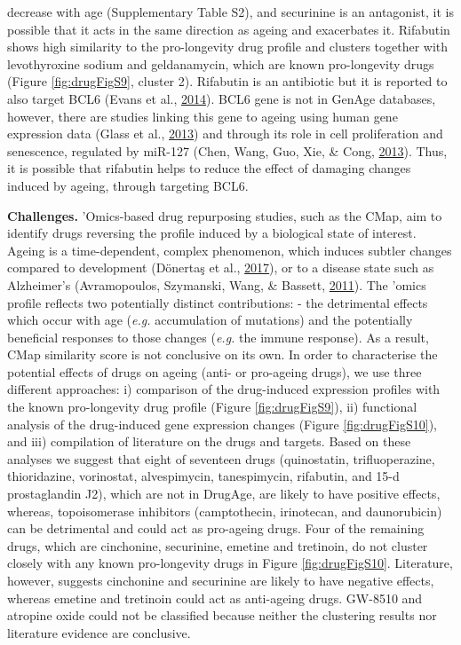 \documentclass[12pt,twoside]{unicam}
\begin{document}
decrease with age (Supplementary Table S2), and securinine is an antagonist, it is possible that it acts in the same direction as ageing and exacerbates it. Rifabutin shows high similarity to the pro-longevity drug profile and clusters together with levothyroxine sodium and geldanamycin, which are known pro-longevity drugs (Figure \ref{fig:drugFigS9}, cluster 2). Rifabutin is an antibiotic but it is reported to also target BCL6 (Evans et al., \protect\hyperlink{ref-Evans2014}{2014}). BCL6 gene is not in GenAge databases, however, there are studies linking this gene to ageing using human gene expression data (Glass et al., \protect\hyperlink{ref-Glass2013}{2013}) and through its role in cell proliferation and senescence, regulated by miR-127 (Chen, Wang, Guo, Xie, \& Cong, \protect\hyperlink{ref-Chen2013}{2013}). Thus, it is possible that rifabutin helps to reduce the effect of damaging changes induced by ageing, through targeting BCL6.

\textbf{Challenges.} 'Omics-based drug repurposing studies, such as the CMap, aim to identify drugs reversing the profile induced by a biological state of interest. Ageing is a time-dependent, complex phenomenon, which induces subtler changes compared to development (Dönertaş et al., \protect\hyperlink{ref-Donertas2017}{2017}), or to a disease state such as Alzheimer's (Avramopoulos, Szymanski, Wang, \& Bassett, \protect\hyperlink{ref-Avramopoulos2011}{2011}). The 'omics profile reflects two potentially distinct contributions: - the detrimental effects which occur with age (\emph{e.g.} accumulation of mutations) and the potentially beneficial responses to those changes (\emph{e.g.} the immune response). As a result, CMap similarity score is not conclusive on its own. In order to characterise the potential effects of drugs on ageing (anti- or pro-ageing drugs), we use three different approaches: i) comparison of the drug-induced expression profiles with the known pro-longevity drug profile (Figure \ref{fig:drugFigS9}), ii) functional analysis of the drug-induced gene expression changes (Figure \ref{fig:drugFigS10}), and iii) compilation of literature on the drugs and targets. Based on these analyses we suggest that eight of seventeen drugs (quinostatin, trifluoperazine, thioridazine, vorinostat, alvespimycin, tanespimycin, rifabutin, and 15-d prostaglandin J2), which are not in DrugAge, are likely to have positive effects, whereas, topoisomerase inhibitors (camptothecin, irinotecan, and daunorubicin) can be detrimental and could act as pro-ageing drugs. Four of the remaining drugs, which are cinchonine, securinine, emetine and tretinoin, do not cluster closely with any known pro-longevity drugs in Figure \ref{fig:drugFigS10}. Literature, however, suggests cinchonine and securinine are likely to have negative effects, whereas emetine and tretinoin could act as anti-ageing drugs. GW-8510 and atropine oxide could not be classified because neither the clustering results nor literature evidence are conclusive.
\end{document}
